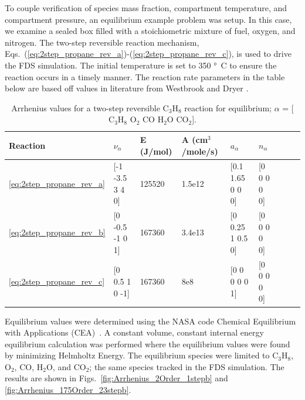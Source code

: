 \documentclass[11pt]{book}
\begin{document}
To couple verification of species mass fraction, compartment temperature, and compartment pressure, an equilibrium example problem was setup. In this case, we examine a sealed box filled with a stoichiometric mixture of fuel, oxygen, and nitrogen. The two-step reversible reaction mechanism, Eqs.~(\ref{eq:2step_propane_rev_a})-(\ref{eq:2step_propane_rev_c}), is used to drive the FDS simulation. The initial temperature is set to 350 \si{\degree C} to ensure the reaction occurs in a timely manner. The reaction rate parameters in the table below are based off values in literature from Westbrook and Dryer \cite{Westbrook:1}.
\begin{table}[ht]
\begin{center}
\caption[Arrhenius values for a two-step reversible C$_3$H$_8$ reaction]{Arrhenius values for a two-step reversible C$_3$H$_8$ reaction for equilibrium; $\alpha$ = [$\mathrm{C_3H_8}$ $\mathrm{O_2}$ $\mathrm{CO}$ $\mathrm{H_2O}$ $\mathrm{CO_2}$].}
\label{two_step_eq_rev_c3h8}
\begin{tabular}{|l|l|l|l|l|l|l|l|l|}
\hline Reaction & $\nu_{\alpha}$ & E (J/mol) & A (cm$^3$/mole/s) & $a_{\alpha}$ & $n_{\alpha}$  \\ \hline \hline
\ref{eq:2step_propane_rev_a} & [-1 -3.5 3 4 0] & 125520 & 1.5e12 & [0.1 1.65 0 0 0] & [0 0 0 0 0] \\ \hline
\ref{eq:2step_propane_rev_b} & [0 -0.5 -1 0 1] & 167360 & 3.4e13 & [0 0.25 1 0.5 0] & [0 0 0 0 0] \\ \hline
\ref{eq:2step_propane_rev_c} & [0 0.5 1 0 -1]  & 167360 & 8e8    & [0 0 0 0 0 1]    & [0 0 0 0 0] \\ \hline
\end{tabular}
\end{center}
\end{table}
Equilibrium values were determined using the NASA code Chemical Equilibrium with Applications (CEA)~\cite{Gordon:1994}. A constant volume, constant internal energy equilibrium calculation was performed where the equilibrium values were found by minimizing Helmholtz Energy. The equilibrium species were limited to $\mathrm{C_3H_8}$, $\mathrm{O_2}$, $\mathrm{CO}$, $\mathrm{H_2O}$, and $\mathrm{CO_2}$; the same species tracked in the FDS simulation.  The results are shown in Figs.~\ref{fig:Arrhenius_2Order_1stepb} and \ref{fig:Arrhenius_175Order_23stepb}.
\end{document}
